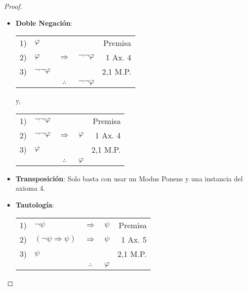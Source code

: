 \documentclass[12pt]{report}
\newcounter{it}
\theoremstyle{largebreak}
\begin{document}
    \begin{proof}
        \begin{itemize}
            \item \textbf{Doble Negación}:
            \begin{center}
                \begin{tabular}{l l c l r}
                    1) & $\varphi$ &  &  & Premisa \\
                    2) & $\varphi$ & $\Rightarrow$ & $\neg\neg\varphi$ & 1 Ax. 4 \\
                    3) & $\neg\neg\varphi$ &  &  & 2,1 M.P. \\
                    \hline
                    & & $\therefore$ & $\neg\neg\varphi$ & \\
                \end{tabular}
            \end{center}
            y,
            \begin{center}
                \begin{tabular}{l l c l r}
                    1) & $\neg\neg\varphi$ &  &  & Premisa \\
                    2) & $\neg\neg\varphi$ & $\Rightarrow$ & $\varphi$ & 1 Ax. 4 \\
                    3) & $\varphi$ &  &  & 2,1 M.P. \\
                    \hline
                    & & $\therefore$ & $\varphi$ & \\
                \end{tabular}
            \end{center}
            \item \textbf{Transposición}: Solo basta con usar un Modus Ponens y una instancia del axioma 4.
            \item \textbf{Tautología}:
            \begin{center}
                \begin{tabular}{l l c l r}
                    1) & $\neg\psi$ & $\Rightarrow$ & $\psi$ & Premisa \\
                    2) & $(\neg\psi\Rightarrow\psi)$ & $\Rightarrow$ & $\psi$ & 1 Ax. 5 \\
                    3) & $\psi$ &  &  & 2,1  M.P. \\
                    \hline
                    & & $\therefore$ & $\varphi$ & \\
                \end{tabular}
            \end{center}
        \end{itemize}
    \end{proof}
\end{document}
